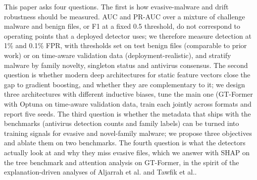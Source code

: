 \documentclass[fleqn,10pt]{wlscirep}
\newcommand{\gtf}{GT\mbox{-}Former}
\begin{document}
This paper asks four questions. The first is how evasive-malware and drift robustness should be measured. AUC and PR-AUC over a mixture of challenge malware and benign files, or F1 at a fixed 0.5 threshold, do not correspond to operating points that a deployed detector uses; we therefore measure detection at 1\% and 0.1\% FPR, with thresholds set on test benign files (comparable to prior work) or on time-aware validation data (deployment-realistic), and stratify malware by family novelty, singleton status and antivirus consensus. The second question is whether modern deep architectures for static feature vectors close the gap to gradient boosting, and whether they are complementary to it; we design three architectures with different inductive biases, tune the main one (\gtf{} with Optuna on time-aware validation data, train each jointly across formats and report five seeds. The third question is whether the metadata that ships with the benchmarks (antivirus detection counts and family labels) can be turned into training signals for evasive and novel-family malware; we propose three objectives and ablate them on two benchmarks. The fourth question is what the detectors actually look at and why they miss evasive files, which we answer with SHAP on the tree benchmark and attention analysis on \gtf{}, in the spirit of the explanation-driven analyses of Aljarrah et al.\cite{aljarrah2026crossattention} and Tawfik et al.\cite{tawfik2026fewshot}.
\end{document}
